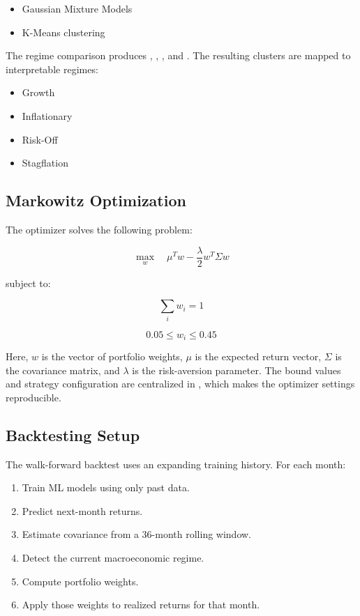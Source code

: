 \documentclass[11pt,a4paper]{article}
\begin{document}
\begin{itemize}[leftmargin=*]
    \item Gaussian Mixture Models
    \item K-Means clustering
\end{itemize}

The regime comparison produces , , , and . The resulting clusters are mapped to interpretable regimes:

\begin{itemize}[leftmargin=*]
    \item Growth
    \item Inflationary
    \item Risk-Off
    \item Stagflation
\end{itemize}

\subsection{Markowitz Optimization}

The optimizer solves the following problem:

\[
\max_w \quad \mu^T w - \frac{\lambda}{2} w^T \Sigma w
\]

subject to:

\[
\sum_i w_i = 1
\]

\[
0.05 \leq w_i \leq 0.45
\]

Here, \(w\) is the vector of portfolio weights, \(\mu\) is the expected return vector, \(\Sigma\) is the covariance matrix, and \(\lambda\) is the risk-aversion parameter. The bound values and strategy configuration are centralized in , which makes the optimizer settings reproducible.

\subsection{Backtesting Setup}

The walk-forward backtest uses an expanding training history. For each month:

\begin{enumerate}[leftmargin=*]
    \item Train ML models using only past data.
    \item Predict next-month returns.
    \item Estimate covariance from a 36-month rolling window.
    \item Detect the current macroeconomic regime.
    \item Compute portfolio weights.
    \item Apply those weights to realized returns for that month.
\end{enumerate}
\end{document}
